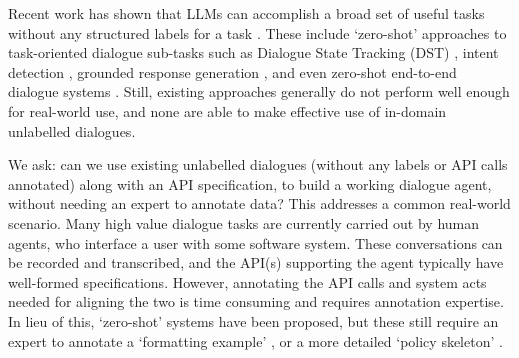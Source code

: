\documentclass[11pt]{article}
\begin{document}
Recent work has shown that LLMs can accomplish a broad set of useful tasks without any structured labels for a task \cite{brown_language_2020}. These include `zero-shot' approaches to task-oriented dialogue sub-tasks such as Dialogue State Tracking (DST) \cite{hu_-context_2022, king-flanigan-2023-diverse, heck-etal-2023-chatgpt}, intent detection \cite{pan_preliminary_2023}, grounded response generation \cite{li2023guiding-fix-arxiv}, and even zero-shot end-to-end dialogue systems \cite{hudecek-dusek-2023-large}. 
Still, existing approaches generally do not perform well enough for real-world use, and none are able to make effective use of in-domain unlabelled dialogues.

We ask: can we use existing unlabelled dialogues (without any labels or API calls annotated) along with an API specification, to build a working dialogue agent, without needing an expert to annotate data?
This addresses a common real-world scenario. 
Many high value dialogue tasks are currently carried out by human agents, who interface a user with some software system. 
These conversations can be recorded and transcribed, and the API(s) supporting the agent typically have well-formed specifications.
However, annotating the API calls and system acts needed for aligning the two is time consuming and requires annotation expertise.
In lieu of this, `zero-shot' systems have been proposed, but these still require an expert to annotate a `formatting example' \cite{hu_-context_2022, king-flanigan-2023-diverse}, or a more detailed `policy skeleton' \cite{zhang-etal-2023-sgp}.
\end{document}
